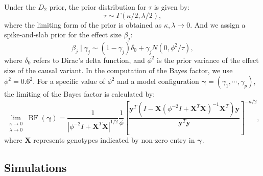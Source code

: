 \documentclass[pdflatex,sn-mathphys-num]{sn-jnl}%
\theoremstyle{thmstyleone}%
\theoremstyle{thmstyletwo}%
\theoremstyle{thmstylethree}%
\begin{document}
Under the $D_2$ prior, the prior distribution for $\tau$ is given by:
$$\tau \sim \Gamma\left(\kappa/2, \lambda/2\right),$$
where the limiting form of the prior is obtained as $\kappa,\lambda \rightarrow 0$. And we assign a spike-and-slab prior for the effect size $\beta_j$:
$$\beta_j \mid \gamma_j \sim (1-\gamma_j)\delta_0 + \gamma_j N\left(0, \phi^2/\tau\right),$$
where $\delta_0$ refers to Dirac's delta function, and $\phi^2$ is the prior variance of the effect size of the causal variant. In the computation of the Bayes factor, we use $\phi^2=0.6^2$. For a specific value of $\phi^2$ and a model configuration $\boldsymbol{\gamma}=\left(\gamma_1,\cdots,\gamma_{p}\right)$, the limiting of the Bayes factor is calculated by:
\begin{equation}
    \lim _{\substack{\kappa \rightarrow 0 \\ \lambda \rightarrow 0}} \operatorname{BF}(\boldsymbol{\gamma})= \frac{1}{|\phi^{-2}I + \mathbf{X}^T\mathbf{X}|^{1 / 2}}  \frac{1}{\phi} \left[\frac{\mathbf{y}^T\left(I-\mathbf{X}\left(\phi^{-2}I+\mathbf{X}^T \mathbf{X}\right)^{-1} \mathbf{X}^T\right) \mathbf{y}}{\mathbf{y}^T \mathbf{y}}\right]^{-n / 2},
\end{equation}
where $\mathbf{X}$ represents genotypes indicated by non-zero entry in $\boldsymbol{\gamma}$.




\subsection{Simulations}\label{subsec2}
\end{document}
